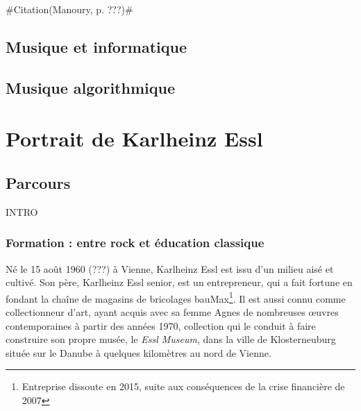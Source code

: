 \documentclass[a4paper,12pt]{article}
\newcommand{\guill}[1]{«~#1~»}
\newcommand{\zitat}[2]{\#Citation(#2)\#}
\begin{document}
\zitat{Les débuts de cette \emph{computer music} nous emmènent donc bien loin d'une expérience du temps réel\dots
Manoury : C'était, en effet, un retour au temps différé. À l'époque où les synthétiseurs commençaient à être utilisés pour les tâches très précises, l'intérêt de l'informatique est rapidement devenu manifeste. Cependant, ce n'est qu'au début des années quatre-ving qu'ont été conçus les premiers ordinateurs suffisamment rapides pour effectuer les calculs en temps réel --- disons suffisamment rapidement pour que l'oreille ne perçoive pas le temps de calcul. Le prototype le plus connu est la 4X. C'était la première fois que l'on pouvait atteindre un \guill{temps réel} numérique, c'est-à-dire inscriptible sur une matière, et cela ouvrait immédiatement la possibilité d'interagir directement avec le jeu instrumental, de se synchroniser avec lui, d'effectuer les calculs au moment même du concert, avec le son du concert et non plus à partir d'une source figée.}
{Manoury, p. ???}

\subsection*{Musique et informatique}

\subsection{Musique algorithmique}


\section{Portrait de Karlheinz Essl}

\subsection{Parcours}

INTRO

\subsubsection{Formation : entre rock et éducation classique}

Né le 15 août 1960 (???) à Vienne, Karlheinz Essl est issu d'un milieu aisé et cultivé. Son père, Karlheinz Essl senior, est un entrepreneur, qui a fait fortune en fondant la chaîne de magasins de bricolages bauMax\footnote{Entreprise dissoute en 2015, suite aux conséquences de la crise financière de 2007}. Il est aussi connu comme collectionneur d'art, ayant acquis avec sa femme Agnes de nombreuses œuvres contemporaines à partir des années 1970, collection qui le conduit à faire construire son propre musée, le \emph{Essl Museum}, dans la ville de Klosterneuburg située sur le Danube à quelques kilomètres au nord de Vienne.
\end{document}
